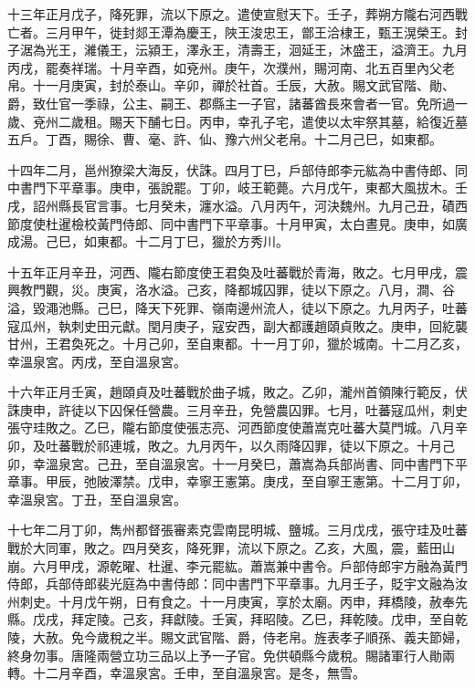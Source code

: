 \begin{pinyinscope}
 十三年正月戊子，降死罪，流以下原之。遣使宣慰天下。壬子，葬朔方隴右河西戰亡者。三月甲午，徙封郯王潭為慶王，陜王浚忠王，鄫王洽棣王，甄王滉榮王。封子涺為光王，濰儀王，沄潁王，澤永王，清壽王，洄延王，沐盛王，溢濟王。九月丙戌，罷奏祥瑞。十月辛酉，如兗州。庚午，次濮州，賜河南、北五百里內父老帛。十一月庚寅，封於泰山。辛卯，禪於社首。壬辰，大赦。賜文武官階、勛、爵，致仕官一季祿，公主、嗣王、郡縣主一子官，諸蕃酋長來會者一官。免所過一歲、兗州二歲租。賜天下酺七日。丙申，幸孔子宅，遣使以太牢祭其墓，給復近墓五戶。丁酉，賜徐、曹、毫、許、仙、豫六州父老帛。十二月己巳，如東都。



 十四年二月，邕州獠梁大海反，伏誅。四月丁巳，戶部侍郎李元紘為中書侍郎、同中書門下平章事。庚申，張說罷。丁卯，岐王範薨。六月戊午，東都大風拔木。壬戌，詔州縣長官言事。七月癸未，瀍水溢。八月丙午，河決魏州。九月己丑，磧西節度使杜暹檢校黃門侍郎、同中書門下平章事。十月甲寅，太白晝見。庚申，如廣成湯。己巳，如東都。十二月丁巳，獵於方秀川。



 十五年正月辛丑，河西、隴右節度使王君奐及吐蕃戰於青海，敗之。七月甲戌，震興教門觀，災。庚寅，洛水溢。己亥，降都城囚罪，徒以下原之。八月，澗、谷溢，毀澠池縣。己巳，降天下死罪、嶺南邊州流人，徒以下原之。九月丙子，吐蕃寇瓜州，執刺史田元獻。閏月庚子，寇安西，副大都護趙頤貞敗之。庚申，回紇襲甘州，王君奐死之。十月己卯，至自東都。十一月丁卯，獵於城南。十二月乙亥，幸溫泉宮。丙戌，至自溫泉宮。



 十六年正月壬寅，趙頤貞及吐蕃戰於曲子城，敗之。乙卯，瀧州首領陳行範反，伏誅庚申，許徒以下囚保任營農。三月辛丑，免營農囚罪。七月，吐蕃寇瓜州，刺史張守珪敗之。乙巳，隴右節度使張志亮、河西節度使蕭嵩克吐蕃大莫門城。八月辛卯，及吐蕃戰於祁連城，敗之。九月丙午，以久雨降囚罪，徒以下原之。十月己卯，幸溫泉宮。己丑，至自溫泉宮。十一月癸巳，蕭嵩為兵部尚書、同中書門下平章事。甲辰，弛陂澤禁。戊申，幸寧王憲第。庚戌，至自寧王憲第。十二月丁卯，幸溫泉宮。丁丑，至自溫泉宮。



 十七年二月丁卯，雋州都督張審素克雲南昆明城、鹽城。三月戊戌，張守珪及吐蕃戰於大同軍，敗之。四月癸亥，降死罪，流以下原之。乙亥，大風，震，藍田山崩。六月甲戌，源乾曜、杜暹、李元罷紘。蕭嵩兼中書令。戶部侍郎宇方融為黃門侍郎，兵部侍郎裴光庭為中書侍郎：同中書門下平章事。九月壬子，貶宇文融為汝州刺史。十月戊午朔，日有食之。十一月庚寅，享於太廟。丙申，拜橋陵，赦奉先縣。戊戌，拜定陵。己亥，拜獻陵。壬寅，拜昭陵。乙巳，拜乾陵。戊申，至自乾陵，大赦。免今歲稅之半。賜文武官階、爵，侍老帛。旌表孝子順孫、義夫節婦，終身勿事。唐隆兩營立功三品以上予一子官。免供頓縣今歲稅。賜諸軍行人勛兩轉。十二月辛酉，幸溫泉宮。壬申，至自溫泉宮。是冬，無雪。




\end{pinyinscope}
